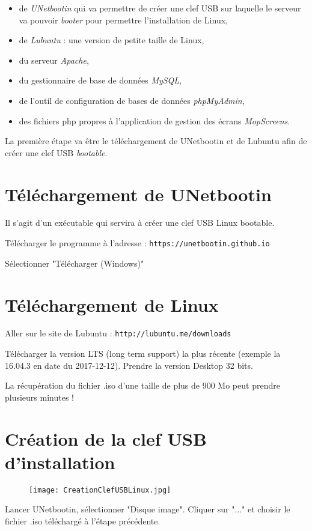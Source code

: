 \documentclass[a4paper]{ffco-rapport}
\begin{document}
	\begin{itemize}
		\item de \emph{UNetbootin} qui va permettre de créer une clef USB sur laquelle le serveur va pouvoir \emph{booter} pour permettre l'installation de Linux,
		\item de \emph{Lubuntu} : une version de petite taille de Linux,
		\item du serveur \emph{Apache},
		\item du gestionnaire de base de données \emph{MySQL},
		\item de l'outil de configuration de bases de données \emph{phpMyAdmin},
		\item des fichiers php propres à l'application de gestion des écrans \emph{MopScreens}.
	\end{itemize}
	
	La première étape va être le téléchargement de UNetbootin et de Lubuntu afin de créer une clef USB \emph{bootable}.
	
	\section{Téléchargement de UNetbootin}

Il s'agit d'un exécutable qui servira à créer une clef USB Linux bootable.

Télécharger le programme à l'adresse : \verb|https://unetbootin.github.io|

Sélectionner "Télécharger (Windows)"

	\section{Téléchargement de Linux}
Aller sur le site de Lubuntu : \verb|http://lubuntu.me/downloads|

Télécharger la version LTS (long term support) la plus récente (exemple la 16.04.3 en date du 2017-12-12). Prendre la version Desktop 32 bits.

La récupération du fichier .iso d'une taille de plus de 900 Mo peut prendre plusieurs minutes !

	\section{Création de la clef USB d'installation}
\begin{figure}[!ht]
	\centering
		\texttt{[image: CreationClefUSBLinux.jpg]}
	\label{fig:a}
\end{figure}
Lancer UNetbootin, sélectionner "Disque image". Cliquer sur "..." et choisir le fichier .iso téléchargé à l'étape précédente.
\end{document}
